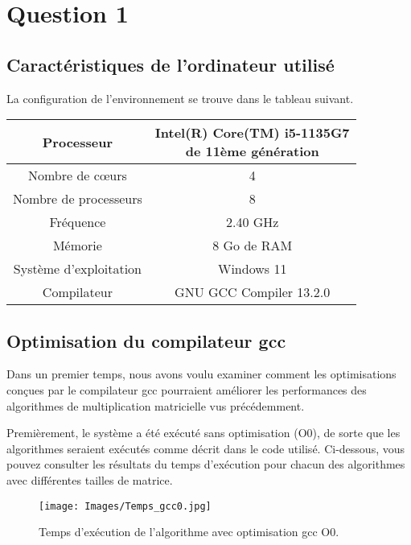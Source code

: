 \documentclass[../CSC_5RO06_TA.tex]{subfiles}
\begin{document}
\section*{Question 1}

\subsection{Caractéristiques de l'ordinateur utilisé}

La configuration de l'environnement se trouve dans le tableau suivant.

\begin{table}[h]
    \centering
    \begin{tabular}{c|c}
        \hline
        Processeur & \makecell{Intel(R) Core(TM) i5-1135G7\\ de 11ème génération} \\ \hline
        Nombre de cœurs & 4\\ \hline
        Nombre de processeurs & 8\\ \hline
        Fréquence & 2.40 GHz  \\ \hline
        Mémorie & 8 Go de RAM  \\ \hline
        Système d'exploitation & Windows 11  \\ \hline
        Compilateur & GNU GCC Compiler 13.2.0 \\
        \hline   
    \end{tabular}
    \label{tab:my_label}
\end{table}

\subsection{Optimisation du compilateur gcc}

Dans un premier temps, nous avons voulu examiner comment les optimisations conçues par le compilateur gcc pourraient améliorer les performances des algorithmes de multiplication matricielle vus précédemment.

Premièrement, le système a été exécuté sans optimisation (O0), de sorte que les algorithmes seraient exécutés comme décrit dans le code utilisé. Ci-dessous, vous pouvez consulter les résultats du temps d'exécution pour chacun des algorithmes avec différentes tailles de matrice.

\begin{figure}[H]
    \centering
    \texttt{[image: Images/Temps\_gcc0.jpg]}
    \caption{Temps d'exécution de l'algorithme avec optimisation gcc O0.}
    \label{fig:1}
\end{figure}
\end{document}
